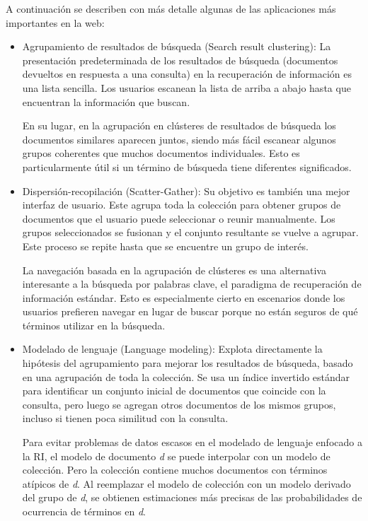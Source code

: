 \documentclass{llncs}
\begin{document}
A continuaci\'on se describen con m\'as detalle algunas de las aplicaciones m\'as importantes en la web:
\begin{itemize}
	\item Agrupamiento de resultados de búsqueda (Search result clustering): La presentación predeterminada de los resultados de búsqueda (documentos devueltos en respuesta a una consulta) en la recuperación de información es una lista sencilla. Los usuarios escanean la lista de arriba a abajo hasta que encuentran la información que buscan. 
	
	En su lugar, en la agrupación en clústeres de resultados de búsqueda los documentos similares aparecen juntos, siendo más fácil escanear algunos grupos coherentes que muchos documentos individuales. Esto es particularmente útil si un término de búsqueda tiene diferentes significados.
	
	\item Dispersión-recopilación (Scatter-Gather): Su objetivo es tambi\'en una mejor interfaz de usuario. Este agrupa toda la colección para obtener grupos de documentos que el usuario puede seleccionar o reunir manualmente. Los grupos seleccionados se fusionan y el conjunto resultante se vuelve a agrupar. Este proceso se repite hasta que se encuentre un grupo de interés.
	
	La navegación basada en la agrupaci\'on de clústeres es una alternativa interesante a la búsqueda por palabras clave, el paradigma de recuperación de información estándar. Esto es especialmente cierto en escenarios donde los usuarios prefieren navegar en lugar de buscar porque no están seguros de qué términos utilizar en la búsqueda.
	
	\item Modelado de lenguaje (Language modeling): Explota directamente la hipótesis del agrupamiento para mejorar los resultados de búsqueda, basado en una agrupación de toda la colección. Se usa un índice invertido estándar para identificar un conjunto inicial de documentos que coincide con la consulta, pero luego se agregan otros documentos de los mismos grupos, incluso si tienen poca similitud con la consulta. 
	
 	Para evitar problemas de datos escasos en el modelado de lenguaje enfocado a la RI, el modelo de documento \textit{d} se puede interpolar con un modelo de colección. Pero la colección contiene muchos documentos con términos atípicos de \textit{d}. Al reemplazar el modelo de colección con un modelo derivado del grupo de \textit{d}, se obtienen estimaciones más precisas de las probabilidades de ocurrencia de términos en \textit{d}.
	

\end{itemize}
\end{document}
